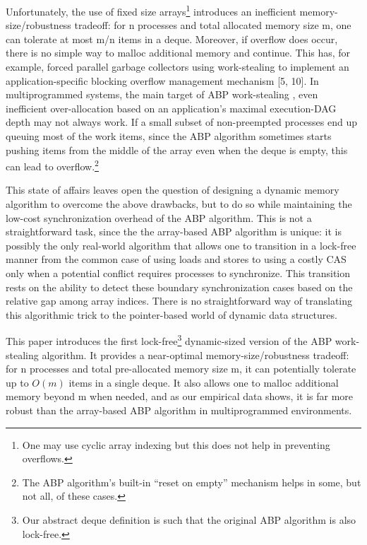 Unfortunately, the use of fixed size arrays\footnote{One may use
  cyclic array indexing but this does not help in preventing
  overflows.} introduces an inefficient memory-size/robustness
tradeoff: for n processes and total allocated memory size m, one can
tolerate at most m/n items in a deque. Moreover, if overflow does
occur, there is no simple way to malloc additional memory and
continue. This has, for example, forced parallel garbage collectors
using work-stealing to implement an application-specific blocking
overflow management mechanism [5, 10]. In multiprogrammed systems, the
main target of ABP work-stealing \cite{Arora2001}, even inefficient
over-allocation based on an application's maximal execution-DAG depth
\cite{Arora2001, Blumofe1999} may not always work. If a small subset
of non-preempted processes end up queuing most of the work items,
since the ABP algorithm sometimes starts pushing items from the middle
of the array even when the deque is empty, this can lead to
overflow.\footnote{The ABP algorithm's built-in ``reset on empty''
  mechanism helps in some, but not all, of these cases.}

This state of affairs leaves open the question of designing a
dynamic memory algorithm to overcome the above drawbacks, but to do so
while maintaining the low-cost synchronization overhead of the ABP
algorithm. This is not a straightforward task, since the the
array-based ABP algorithm is unique: it is possibly the only
real-world algorithm that allows one to transition in a lock-free
manner from the common case of using loads and stores to using a
costly CAS only when a potential conflict requires processes to
synchronize. This transition rests on the ability to detect these
boundary synchronization cases based on the relative gap among array
indices. There is no straightforward way of translating this
algorithmic trick to the pointer-based world of dynamic data
structures.


This paper introduces the first lock-free\footnote{Our abstract deque
  definition is such that the original ABP algorithm is also
  lock-free.} dynamic-sized version of the ABP work-stealing
algorithm. It provides a near-optimal memory-size/robustness tradeoff:
for n processes and total pre-allocated memory size m, it can
potentially tolerate up to $O(m)$ items in a single deque. It also
allows one to malloc additional memory beyond m when needed, and as
our empirical data shows, it is far more robust than the array-based
ABP algorithm in multiprogrammed environments.

